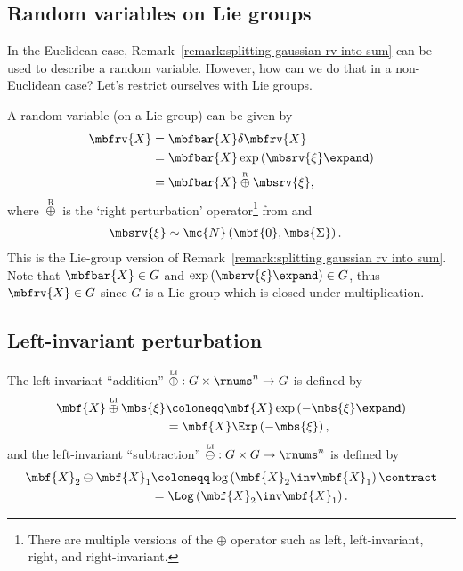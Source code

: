 \documentclass[nobib]{tufte-handout}
\newcommand{\liplus}{\overset{{\scriptscriptstyle\mathrm{LI}}}{\oplus}}
\newcommand{\rplus}{\overset{{\scriptscriptstyle\mathrm{R}}}{\oplus}}
\newcommand{\liminus}{\overset{{\scriptscriptstyle\mathrm{LI}}}{\ominus}}
\begin{document}
    \subsection{Random variables on Lie groups}
    In the Euclidean case, Remark~\ref{remark:splitting gaussian rv into sum} can be used to describe a random variable. However, how can we do that in a non-Euclidean case? Let's restrict ourselves with Lie groups. 
     
    
    A random variable (on a Lie group) can be given by
    \begin{align}
        \mbfrv{X} &= \mbfbar{X}\delta\mbfrv{X}\\
        &= \mbfbar{X}\exp\left( \mbsrv{\xi}\expand \right)\\
        &= \mbfbar{X} \rplus \mbsrv{\xi},
    \end{align}
    where $\rplus$ is the `right perturbation' operator\footnote{There are multiple versions of the $\oplus$ operator such as left, left-invariant, right, and right-invariant.} from
     \cite{Sola_micro_2019} and
    \begin{align}
        \mbsrv{\xi} &\sim \mc{N}\left( \mbf{0}, \mbs{\Sigma} \right).
    \end{align}
    This is the Lie-group version of Remark~\ref{remark:splitting gaussian rv into sum}. Note that $\mbfbar{X}\in G$ and $\exp\left( \mbsrv{\xi}\expand \right)\in G$, thus $\mbfrv{X}\in G$ since $G$ is a Lie group which is closed under multiplication.

    \subsection{Left-invariant perturbation}
    The left-invariant ``addition'' $\liplus : G \times \rnums^{n} \to G$ is defined by
    \begin{align}
        \mbf{X}\liplus\mbs{\xi} 
        &\coloneqq \mbf{X}\exp\left( -\mbs{\xi}\expand \right)\\
        &= \mbf{X}\Exp\left( -\mbs{\xi} \right),
    \end{align}
    and the left-invariant ``subtraction'' $\liminus : G \times G \to \rnums^{n}$ is defined by
    \begin{align}
        \mbf{X}_{2}\ominus\mbf{X}_{1} 
        &\coloneqq \log\left(\mbf{X}_{2}\inv\mbf{X}_{1}\right)\contract\\
        &= \Log\left(\mbf{X}_{2}\inv\mbf{X}_{1}\right).
    \end{align}
\end{document}
